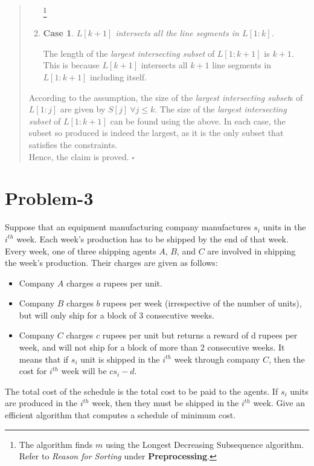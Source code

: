 \documentclass[12pt]{report}
\newtheorem{case}{Case}
\begin{document}
\begin{quote}
\begin{enumerate}
            \footnote{
                The algorithm finds $m$ using the Longest Decreasing Subsequence algorithm.
                Refer to \textit{Reason for Sorting} under \textbf{Preprocessing}.
            }
            \item
            \begin{case}
                $L[k+1]$ intersects all the line segments in $L[1:k]$.
            \end{case}
            The length of the \textit{largest intersecting subset} of $L[1:k+1]$ is $k+1$.
            This is because $L[k+1]$ intersects all $k+1$ line segments in $L[1:k+1]$ including itself.
        \end{enumerate}
        According to the assumption, the size of the \textit{largest intersecting subset}s of $L[1:j]$ are given by $S[j] \ \forall j \le k$.
        The size of the \textit{largest intersecting subset} of $L[1:k+1]$ can be found using the above.
        In each case, the subset so produced is indeed the largest, as it is the only subset that satisfies the constraints.
        \vspace*{7.5pt} \\
        Hence, the claim is proved. \hfill $\square$
    \end{quote}
    \vfill
    \pagebreak

    \section*{\huge{Problem-3}}
    Suppose that an equipment manufacturing company manufactures $s_{i}$ units in the $i^{th}$ week.
    Each week's production has to be shipped by the end of that week.
    Every week, one of three shipping agents $A$, $B$, and $C$ are involved in shipping the week's production.
    Their charges are given as follows:
    \begin{itemize}
        \item
        Company $A$ charges $a$ rupees per unit.
        \item
        Company $B$ charges $b$ rupees per week (irrespective of the number of units), but will only ship for a block of 3 consecutive weeks.
        \item
        Company $C$ charges $c$ rupees per unit but returns a reward of d rupees per week, and will not ship for a block of more than 2 consecutive weeks.
        It means that if $s_{i}$ unit is shipped in the $i^{th}$ week through company $C$, then the cost for $i^{th}$ week will be $cs_{i} - d$.
    \end{itemize}
    The total cost of the schedule is the total cost to be paid to the agents. If $s_{i}$ units are produced in the $i^{th}$ week, then they must be shipped
    in the $i^{th}$ week.
    Give an efficient algorithm that computes a schedule of minimum cost.
\end{document}
